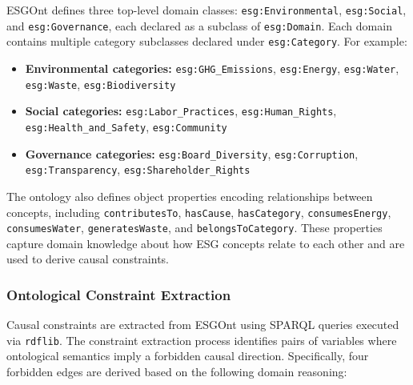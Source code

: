 \documentclass[a4paper,11pt,oneside]{article}
\begin{document}
ESGOnt defines three top-level domain classes: \texttt{esg:Environmental}, \texttt{esg:Social}, and \texttt{esg:Governance}, each declared as a subclass of \texttt{esg:Domain}. Each domain contains multiple category subclasses declared under \texttt{esg:Category}. For example:

\begin{itemize}
    \item \textbf{Environmental categories:} \texttt{esg:GHG\_Emissions}, \texttt{esg:Energy}, \texttt{esg:Water}, \texttt{esg:Waste}, \texttt{esg:Biodiversity}
    \item \textbf{Social categories:} \texttt{esg:Labor\_Practices}, \texttt{esg:Human\_Rights}, \texttt{esg:Health\_and\_Safety}, \texttt{esg:Community}
    \item \textbf{Governance categories:} \texttt{esg:Board\_Diversity}, \texttt{esg:Corruption}, \texttt{esg:Transparency}, \texttt{esg:Shareholder\_Rights}
\end{itemize}

The ontology also defines object properties encoding relationships between concepts, including \texttt{contributesTo}, \texttt{hasCause}, \texttt{hasCategory}, \texttt{consumesEnergy}, \texttt{consumesWater}, \texttt{generatesWaste}, and \texttt{belongsToCategory}. These properties capture domain knowledge about how ESG concepts relate to each other and are used to derive causal constraints.

\subsubsection{Ontological Constraint Extraction}

Causal constraints are extracted from ESGOnt using SPARQL queries executed via \texttt{rdflib}. The constraint extraction process identifies pairs of variables where ontological semantics imply a forbidden causal direction. Specifically, four forbidden edges are derived based on the following domain reasoning:
\end{document}
